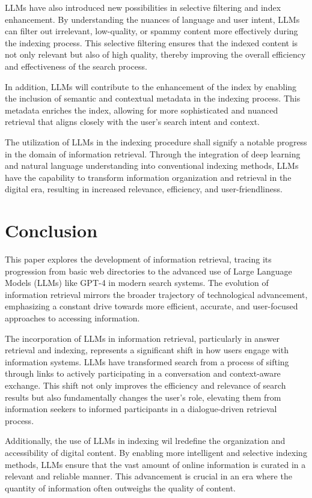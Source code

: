 \documentclass{article}
\begin{document}
LLMs have also introduced new possibilities in selective filtering and index enhancement. By understanding the nuances of language and user intent, LLMs can filter out irrelevant, low-quality, or spammy content more effectively during the indexing process. This selective filtering ensures that the indexed content is not only relevant but also of high quality, thereby improving the overall efficiency and effectiveness of the search process.

In addition, LLMs will contribute to the enhancement of the index by enabling the inclusion of semantic and contextual metadata in the indexing process. This metadata enriches the index, allowing for more sophisticated and nuanced retrieval that aligns closely with the user's search intent and context.

The utilization of LLMs in the indexing procedure shall signify a notable progress in the domain of information retrieval. Through the integration of deep learning and natural language understanding into conventional indexing methods, LLMs have the capability to transform information organization and retrieval in the digital era, resulting in increased relevance, efficiency, and user-friendliness.

\section{Conclusion}

This paper explores the development of information retrieval, tracing its progression from basic web directories to the advanced use of Large Language Models (LLMs) like GPT-4 in modern search systems. The evolution of information retrieval mirrors the broader trajectory of technological advancement, emphasizing a constant drive towards more efficient, accurate, and user-focused approaches to accessing information. 

The incorporation of LLMs in information retrieval, particularly in answer retrieval and indexing, represents a significant shift in how users engage with information systems. LLMs have transformed search from a process of sifting through links to actively participating in a conversation and context-aware exchange. This shift not only improves the efficiency and relevance of search results but also fundamentally changes the user's role, elevating them from information seekers to informed participants in a dialogue-driven retrieval process. 

Additionally, the use of LLMs in indexing wil lredefine the organization and accessibility of digital content. By enabling more intelligent and selective indexing methods, LLMs ensure that the vast amount of online information is curated in a relevant and reliable manner. This advancement is crucial in an era where the quantity of information often outweighs the quality of content. 
\end{document}
